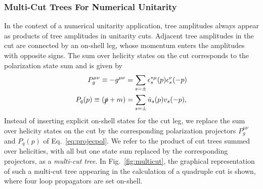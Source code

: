 \subsubsection{Multi-Cut Trees For Numerical Unitarity}
\label{sec:singlecutunit}
In the context of a numerical unitarity application, tree amplitudes
always appear as products of tree amplitudes in unitarity cuts. Adjacent tree amplitudes in the cut are connected
by an on-shell leg, whose momentum enters the amplitudes with opposite signs. The sum over helicity states on the cut corresponds to
the polarization state sum and is given by
\begin{align}\label{eq:projecpol}
\begin{split}
  P^{\mu\nu}_g \equiv -g^{\mu \nu} & =
  \sum_{s=\pm}\epsilon_s^{*\mu}(p)\epsilon_s^\nu(-p)\\
P_q(p) \equiv (\slashed{p} + m) &= \sum_{s=\pm} \bar{u}_s(p)v_s(-p),
\end{split}
\end{align}
Instead of inserting explicit on-shell states for the cut leg, we replace the sum over helicity states on the cut by the corresponding
polarization projectors $P^{\mu\nu}_g$ and $P_q(p)$ of Eq.~\eqref{eq:projecpol}. We refer to the product
of cut trees summed over helicities, with all but one state sum replaced by
the corresponding projectors, as a \textit{multi-cut tree}. In
Fig.~\ref{fig:multicut}, the graphical representation of such a
multi-cut tree appearing in the calculation of a quadruple cut is
shown, where four loop propagators are set on-shell. 
